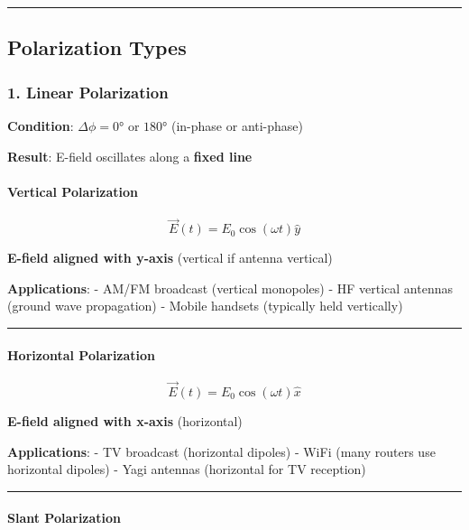 \begin{center}\rule{0.5\linewidth}{0.5pt}\end{center}

\subsection{Polarization Types}\label{polarization-types}

\subsubsection{1. Linear Polarization}\label{linear-polarization}

\textbf{Condition}: \(\Delta\phi = 0°\) or \(180°\) (in-phase or
anti-phase)

\textbf{Result}: E-field oscillates along a \textbf{fixed line}

\paragraph{Vertical Polarization}\label{vertical-polarization}

\[
\vec{E}(t) = E_0 \cos(\omega t)\hat{y}
\]

\textbf{E-field aligned with y-axis} (vertical if antenna vertical)

\textbf{Applications}: - AM/FM broadcast (vertical monopoles) - HF
vertical antennas (ground wave propagation) - Mobile handsets (typically
held vertically)

\begin{center}\rule{0.5\linewidth}{0.5pt}\end{center}

\paragraph{Horizontal Polarization}\label{horizontal-polarization}

\[
\vec{E}(t) = E_0 \cos(\omega t)\hat{x}
\]

\textbf{E-field aligned with x-axis} (horizontal)

\textbf{Applications}: - TV broadcast (horizontal dipoles) - WiFi (many
routers use horizontal dipoles) - Yagi antennas (horizontal for TV
reception)

\begin{center}\rule{0.5\linewidth}{0.5pt}\end{center}

\paragraph{Slant Polarization}\label{slant-polarization}

